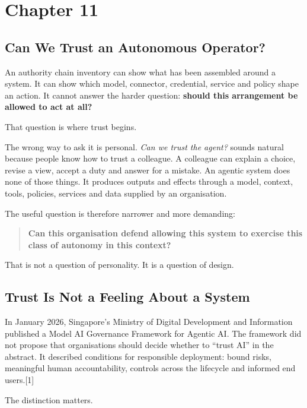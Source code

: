 \section{Chapter 11}\label{chapter-11}

\subsection{Can We Trust an Autonomous
Operator?}\label{can-we-trust-an-autonomous-operator}

An authority chain inventory can show what has been assembled around a
system. It can show which model, connector, credential, service and
policy shape an action. It cannot answer the harder question:
\textbf{should this arrangement be allowed to act at all?}

That question is where trust begins.

The wrong way to ask it is personal. \emph{Can we trust the agent?}
sounds natural because people know how to trust a colleague. A colleague
can explain a choice, revise a view, accept a duty and answer for a
mistake. An agentic system does none of those things. It produces
outputs and effects through a model, context, tools, policies, services
and data supplied by an organisation.

The useful question is therefore narrower and more demanding:

\begin{quote}
\textbf{Can this organisation defend allowing this system to exercise
this class of autonomy in this context?}
\end{quote}

That is not a question of personality. It is a question of design.

\subsection{Trust Is Not a Feeling About a
System}\label{trust-is-not-a-feeling-about-a-system}

In January 2026, Singapore's Ministry of Digital Development and
Information published a Model AI Governance Framework for Agentic AI.
The framework did not propose that organisations should decide whether
to ``trust AI'' in the abstract. It described conditions for responsible
deployment: bound risks, meaningful human accountability, controls
across the lifecycle and informed end users.{[}1{]}

The distinction matters.

